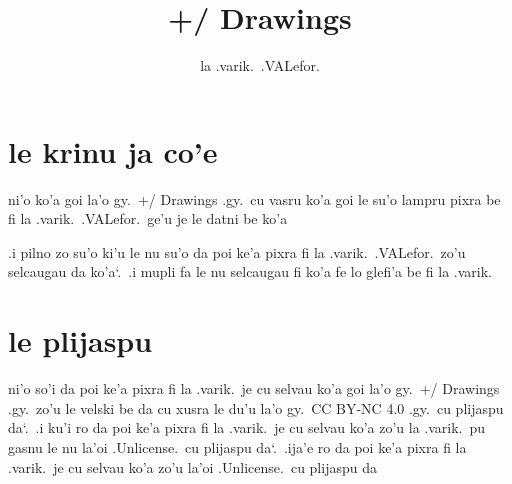 \documentclass{report}
\title{+/ Drawings}
\author{la .varik.\ .VALefor.}
\newcommand\sds{\spacefactor\sfcode`.\ \space}
\begin{document}
\maketitle{}
\tableofcontents{}
\chapter{le krinu ja co'e}
ni'o ko'a goi la'o gy.\ +/ Drawings .gy.\ cu vasru ko'a goi le su'o lampru pixra be fi la .varik.\ .VALefor.\ ge'u je le datni be ko'a

.i pilno zo su'o ki'u le nu su'o da poi ke'a pixra fi la .varik.\ .VALefor.\ zo'u selcaugau da ko'a\sds  .i mupli fa le nu selcaugau fi ko'a fe lo glefi'a be fi la .varik.

\chapter{le plijaspu}
ni'o so'i da poi ke'a pixra fi la .varik.\ je cu selvau ko'a goi la'o gy.\ +/ Drawings .gy.\ zo'u le velski be da cu xusra le du'u la'o gy.\ CC BY-NC 4.0 .gy.\ cu plijaspu da\sds  .i ku'i ro da poi ke'a pixra fi la .varik.\ je cu selvau ko'a zo'u la .varik.\ pu gasnu le nu la'oi .Unlicense.\ cu plijaspu da\sds  .ija'e ro da poi ke'a pixra fi la .varik.\ je cu selvau ko'a zo'u la'oi .Unlicense.\ cu plijaspu da
\end{document}
